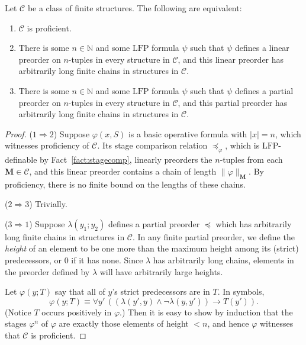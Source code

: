 \documentclass{lmcs}
\newcommand{\LFP}{\mathrm{LFP}}
\newcommand{\M}{\mathbf{M}}
\theoremstyle{thmC}
\begin{document}
\begin{thm}\label{thm:preorder}
\label{main} Let $\mathcal{C}$ be a class of finite structures. The following are equivalent:
\begin{enumerate}
\item $\mathcal{C}$ is proficient.

\item There is some $n \in \mathbb{N}$ and some $\LFP$ formula $\psi$ such that $\psi$ defines a linear preorder on $n$-tuples in every structure in $\mathcal{C}$, and this linear preorder has arbitrarily long finite chains in structures in $\mathcal{C}$. 

\item There is some $n \in \mathbb{N}$ and some $\LFP$ formula $\psi$ such that $\psi$ defines a partial preorder on $n$-tuples in every structure in $\mathcal{C}$, and this partial preorder has arbitrarily long finite chains in structures in $\mathcal{C}$.
\end{enumerate}
\end{thm}
\begin{proof}

($1\Rightarrow 2$) Suppose $\varphi(x,S)$ is a basic operative formula with $|x| = n$, which witnesses proficiency of $\mathcal{C}$. Its stage comparison relation $\preceq_\varphi$, which is $\LFP$-definable by Fact~\ref{fact:stagecomp}, linearly preorders the $n$-tuples from each $\M\in\mathcal{C}$, and this linear preorder contains a chain of length $\|\varphi\|_\M$. By proficiency, there is no finite bound on the lengths of these chains. 

($2\Rightarrow 3$) Trivially.

($3\Rightarrow1$) Suppose $\lambda(y_{1};y_{2})$ defines a partial preorder $\preceq$ which has arbitrarily long finite chains in structures in $\mathcal{C}$. In any finite partial
preorder, we define the \emph{height} of an element to be one more
than the maximum height among its (strict) predecessors, or 0 if it has none.
Since $\lambda$ has arbitrarily long chains, elements in the preorder
defined by $\lambda$ will have arbitrarily large heights.

Let $\varphi(y;T)$ say that all of $y$'s strict predecessors are
in $T$. In symbols, 
\[
\varphi(y;T)\equiv\forall y'\,((\lambda(y',y)\wedge\neg\lambda(y,y'))\to T(y')).
\]
(Notice $T$ occurs positively in $\varphi$.) Then it is easy to
show by induction that the stages $\varphi^n$ of $\varphi$
are exactly those elements of height $<n$, and hence $\varphi$ witnesses that $\mathcal{C}$ is
proficient. 
\end{proof}
\end{document}
